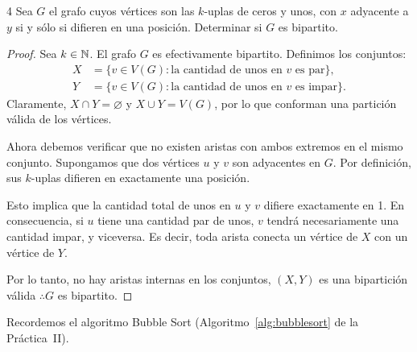 \begin{ejercicioEntregar}{4}
    Sea \( G \) el grafo cuyos vértices son las \( k \)-uplas de ceros y unos, con \( x \) adyacente a \( y \) si y sólo si difieren en una posición. Determinar si \( G \) es bipartito.
\end{ejercicioEntregar}
\begin{proof}
    Sea \( k \in \mathbb{N} \). El grafo \(G\) es efectivamente bipartito. Definimos los conjuntos:
    \[
        \begin{aligned}
            X & = \{ v \in V(G) : \text{la cantidad de unos en } v \text{ es par} \},   \\
            Y & = \{ v \in V(G) : \text{la cantidad de unos en } v \text{ es impar} \}.
        \end{aligned}
    \]
    Claramente, \( X \cap Y = \varnothing \) y \(X \cup Y = V(G)\), por lo que conforman una partición válida de los vértices.

    Ahora debemos verificar que no existen aristas con ambos extremos en el mismo conjunto. Supongamos que dos vértices \(u\) y \(v\) son adyacentes en \(G\). Por definición, sus \(k\)-uplas difieren en exactamente una posición.

    Esto implica que la cantidad total de unos en \(u\) y \(v\) difiere exactamente en 1. En consecuencia, si \(u\) tiene una cantidad par de unos, \(v\) tendrá necesariamente una cantidad impar, y viceversa. Es decir, toda arista conecta un vértice de \(X\) con un vértice de \(Y\).

    Por lo tanto, no hay aristas internas en los conjuntos, \((X, Y)\) es una bipartición válida \( \therefore G \) es bipartito.
\end{proof}

\vspace{0.5cm}

Recordemos el algoritmo Bubble Sort (Algoritmo~\ref{alg:bubblesort} de la Práctica~II).

